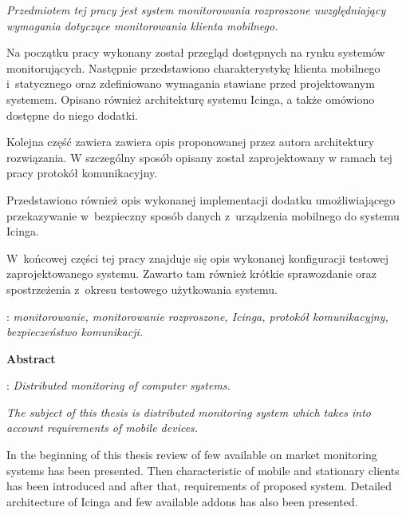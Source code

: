 \begin{titlepage}
    {\itshape Przedmiotem tej pracy jest system monitorowania
      rozproszone uwzględniający wymagania dotyczące monitorowania
      klienta mobilnego.

      \indent Na początku pracy wykonany został przegląd dostępnych na
      rynku systemów monitorujących. Następnie przedstawiono
      charakterystykę klienta mobilnego i~statycznego oraz
      zdefiniowano wymagania stawiane przed projektowanym
      systemem. Opisano również architekturę systemu Icinga, a także
      omówiono dostępne do niego dodatki.

      \indent Kolejna część zawiera zawiera opis proponowanej przez
      autora architektury rozwiązania. W szczególny sposób opisany
      został zaprojektowany w ramach tej pracy protokół komunikacyjny.

      \indent Przedstawiono również opis wykonanej implementacji
      dodatku umożliwiającego przekazywanie w~bezpieczny sposób danych
      z~urządzenia mobilnego do systemu Icinga.

      \indent W~końcowej części tej pracy znajduje się opis wykonanej
      konfiguracji testowej zaprojektowanego systemu. Zawarto tam
      również krótkie sprawozdanie oraz spostrzeżenia z~okresu
      testowego użytkowania systemu.}\vspace*{1\baselineskip}

    : {\itshape monitorowanie,
      monitorowanie rozproszone, Icinga, protokół komunikacyjny, bezpieczeństwo komunikacji.}
    \par
    \vspace{4\baselineskip}
    \begin{center}
	{\large\bfseries Abstract}\par\bigskip
    \end{center}
    : {\itshape Distributed monitoring of computer
      systems.}\par
    \vspace*{1\baselineskip} {\itshape The subject of this thesis is
      distributed monitoring system which takes into account
      requirements of mobile devices.

      \indent In the beginning of this thesis review of few available
      on market monitoring systems has been presented. Then
      characteristic of mobile and stationary clients has been
      introduced and after that, requirements of proposed
      system. Detailed architecture of Icinga and few available
      addons has also been presented.

}
\end{titlepage}
